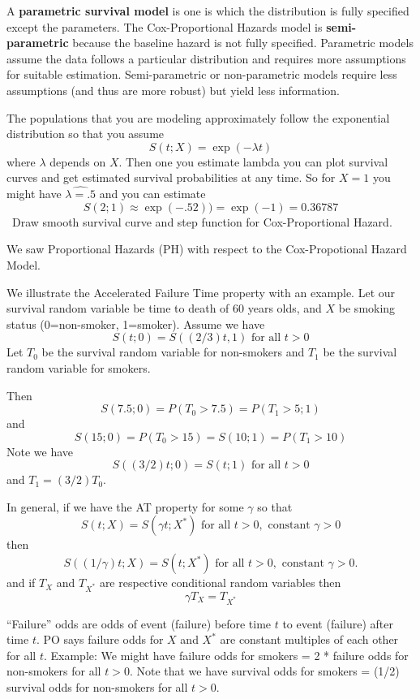 \documentclass{article}
\begin{document}
A \textbf{parametric survival model} is one is which the distribution is fully specified except the parameters. The Cox-Proportional Hazards model is \textbf{semi-parametric} because the baseline hazard is not fully specified. Parametric models assume the data follows a particular distribution and requires more assumptions for suitable estimation. Semi-parametric or non-parametric models require less assumptions (and thus are more robust) but yield less information.

 The populations that you are modeling approximately follow the exponential distribution so that you assume
\[
S(t;X) = \exp(-\lambda t)
\]
where $\lambda$ depends on $X$.
Then one you estimate lambda you can plot survival curves and get estimated survival probabilities at any time.
So for $X=1$ you might have $\hat{\lambda=.5}$ and you can estimate
\[ S(2;1) \approx \exp(-.5 2)) = \exp(-1) = 0.36787
\]
\NTS \, Draw smooth survival curve and step function for Cox-Proportional Hazard.

 We saw Proportional Hazards (PH) with respect to the Cox-Propotional Hazard Model.

 We illustrate the Accelerated Failure Time property with an example. Let our survival random variable be time to death of 60 years olds, and $X$ be smoking status (0=non-smoker, 1=smoker).
Assume we have
\[
S(t;0) = S((2/3)t,1) \text{ for all } t>0
\]
Let $T_0$ be the survival random variable for non-smokers and $T_1$ be the survival random variable for smokers.

Then
\[ S(7.5;0) = P(T_0>7.5) = P(T_1>5;1) \]
 and
\[S(15;0) = P(T_0>15) = S(10;1) = P(T_1>10)
\]
Note we have
\[
S((3/2)t;0) = S(t;1) \text{ for all } t>0
\]
and $T_1=(3/2)T_0$.

 In general, if we have the AT property for some $\gamma$ so that
\[ S(t;X) =  S(\gamma t;X^*)  \text{ for all } t>0, \text{ constant } \gamma > 0
\]
then
 \[ S((1/\gamma)t;X) =  S( t;X^*)  \text{ for all } t>0, \text{ constant } \gamma > 0.
\]
and if $T_X$ and $T_{X^*}$ are respective conditional random variables then
\[
\gamma T_X = T_{X^*}
\]

 ``Failure'' odds are odds of event (failure) before time $t$ to event (failure) after time $t$. PO says failure odds for $X$ and $X^*$ are constant multiples of each other for all $t$. Example: We might have failure odds for smokers = 2 * failure odds for non-smokers for all $t>0$. Note that we have survival odds for smokers = (1/2) survival odds for non-smokers for all $t>0$.
\end{document}
